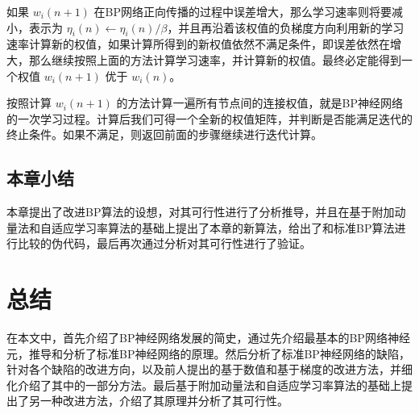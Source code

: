 \documentclass[UTF8]{ctexart}
\begin{document}
如果 $w_i(n+1)$ 在BP网络正向传播的过程中误差增大，那么学习速率则将要减小，表示为 $\eta_i(n) \gets \eta_i(n) / \beta$，并且再沿着该权值的负梯度方向利用新的学习速率计算新的权值，如果计算所得到的新权值依然不满足条件，即误差依然在增大，那么继续按照上面的方法计算学习速率，并计算新的权值。最终必定能得到一个权值 $w_i(n+1)$ 优于 $w_i(n)$。 \par

按照计算 $w_i(n+1)$ 的方法计算一遍所有节点间的连接权值，就是BP神经网络的一次学习过程。计算后我们可得一个全新的权值矩阵，并判断是否能满足迭代的终止条件。如果不满足，则返回前面的步骤继续进行迭代计算。

\subsection{本章小结}

本章提出了改进BP算法的设想，对其可行性进行了分析推导，并且在基于附加动量法和自适应学习率算法的基础上提出了本章的新算法，给出了和标准BP算法进行比较的伪代码，最后再次通过分析对其可行性进行了验证。

\section{总结}

在本文中，首先介绍了BP神经网络发展的简史，通过先介绍最基本的BP网络神经元，推导和分析了标准BP神经网络的原理。然后分析了标准BP神经网络的缺陷，针对各个缺陷的改进方向，以及前人提出的基于数值和基于梯度的改进方法，并细化介绍了其中的一部分方法。最后基于附加动量法和自适应学习率算法的基础上提出了另一种改进方法，介绍了其原理并分析了其可行性。
\end{document}
